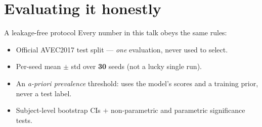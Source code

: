\documentclass[10pt,aspectratio=169]{beamer}
\newcommand{\good}[1]{\textcolor{mGood}{#1}}
\newcommand{\num}[1]{\textbf{#1}}
\begin{document}
\section{Evaluating it honestly}

\begin{frame}{A leakage-free protocol}
  Every number in this talk obeys the same rules:
  \begin{itemize}
    \item Official AVEC2017 test split --- \emph{one} evaluation, never used to select.
    \item Per-seed mean $\pm$ std over \num{30} seeds (not a lucky single run).
    \item An \emph{a-priori prevalence} threshold: uses the model's scores and a
          training prior, \good{never a test label}.
    \item Subject-level bootstrap CIs $+$ non-parametric and parametric significance tests.
  \end{itemize}
\end{frame}
\end{document}
